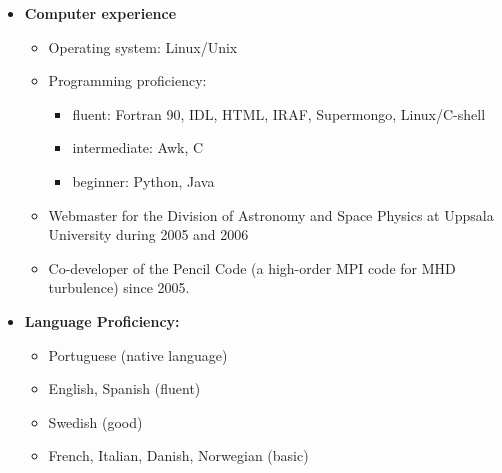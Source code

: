 \documentclass{article}
\newcommand{\hl}[1]{{\large{\sc \underline {#1}}}}
\begin{document}
\begin{itemize}
\item{{\bf Computer experience}

\begin{itemize}
  \item{Operating system: Linux/Unix}
  \item{Programming proficiency:}
    \begin{itemize}
     \item{fluent: Fortran 90, IDL, HTML, IRAF, Supermongo, Linux/C-shell}
     \item{intermediate: Awk, C}
     \item{beginner: Python, Java}
    \end{itemize}
  \item{Webmaster for the Division of Astronomy and Space Physics at Uppsala University during 2005 and 2006}
  \item{Co-developer of the {\sc Pencil Code} (a high-order MPI code for MHD turbulence) since 2005.} 
\end{itemize}}

\item{{\bf Language Proficiency:} 

\begin{itemize}
  \item{Portuguese (native language)}
  \item{English, Spanish (fluent)}
  \item{Swedish (good)}  
  \item{French, Italian, Danish, Norwegian (basic)}  
\end{itemize}}

\end{itemize}

\vspace{5mm}

\hspace{-.55cm}\hl{Employment:}
\end{document}
